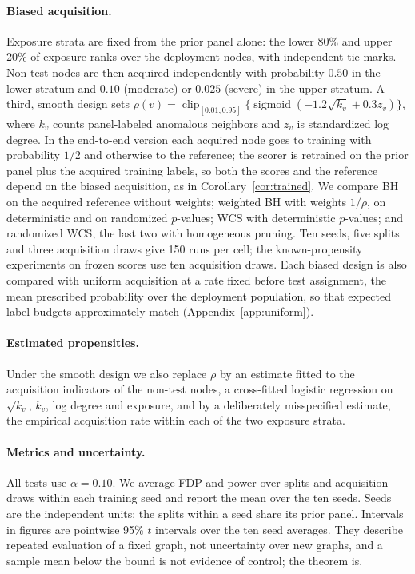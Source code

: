 \documentclass[twoside]{article}
\begin{document}
\paragraph{Biased acquisition.}
Exposure strata are fixed from the prior panel alone: the lower 80\% and upper 20\% of exposure ranks over the deployment nodes, with independent tie marks. Non-test nodes are then acquired independently with probability $0.50$ in the lower stratum and $0.10$ (moderate) or $0.025$ (severe) in the upper stratum. A third, smooth design sets $\rho(v)=\operatorname{clip}_{[0.01,0.95]}\{\operatorname{sigmoid}(-1.2\sqrt{k_v}+0.3z_v)\}$, where $k_v$ counts panel-labeled anomalous neighbors and $z_v$ is standardized log degree. In the end-to-end version each acquired node goes to training with probability $1/2$ and otherwise to the reference; the scorer is retrained on the prior panel plus the acquired training labels, so both the scores and the reference depend on the biased acquisition, as in Corollary~\ref{cor:trained}. We compare BH on the acquired reference without weights; weighted BH with weights $1/\rho$, on deterministic and on randomized $p$-values; WCS with deterministic $p$-values; and randomized WCS, the last two with homogeneous pruning. Ten seeds, five splits and three acquisition draws give 150 runs per cell; the known-propensity experiments on frozen scores use ten acquisition draws. Each biased design is also compared with uniform acquisition at a rate fixed before test assignment, the mean prescribed probability over the deployment population, so that expected label budgets approximately match (Appendix~\ref{app:uniform}).

\paragraph{Estimated propensities.}
Under the smooth design we also replace $\rho$ by an estimate fitted to the acquisition indicators of the non-test nodes, a cross-fitted logistic regression on $\sqrt{k_v}$, $k_v$, log degree and exposure, and by a deliberately misspecified estimate, the empirical acquisition rate within each of the two exposure strata.

\paragraph{Metrics and uncertainty.}
All tests use $\alpha=0.10$. We average FDP and power over splits and acquisition draws within each training seed and report the mean over the ten seeds. Seeds are the independent units; the splits within a seed share its prior panel. Intervals in figures are pointwise 95\% $t$ intervals over the ten seed averages. They describe repeated evaluation of a fixed graph, not uncertainty over new graphs, and a sample mean below the bound is not evidence of control; the theorem is.
\end{document}
